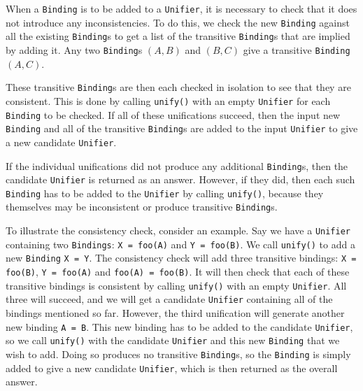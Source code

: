 \documentclass[12pt]{article}
\begin{document}
When a \verb|Binding| is to be added to a \verb|Unifier|, it is necessary to check that it does not introduce any inconsistencies. 
To do this, we check the new \verb|Binding| against all the existing \verb|Binding|s to get a list of the transitive \verb|Binding|s that are implied by adding it. 
Any two \verb|Binding|s $(A,B)$ and $(B,C)$ give a transitive \verb|Binding| $(A,C)$.

These transitive \verb|Binding|s are then each checked in isolation to see that they are consistent. 
This is done by calling \verb|unify()| with an empty \verb|Unifier| for each \verb|Binding| to be checked. 
If all of these unifications succeed, then the input new \verb|Binding| and all of the transitive \verb|Binding|s are added to the input \verb|Unifier| to give a new candidate \verb|Unifier|.

If the individual unifications did not produce any additional \verb|Binding|s, then the candidate \verb|Unifier| is returned as an answer. 
However, if they did, then each such \verb|Binding| has to be added to the \verb|Unifier| by calling \verb|unify()|, because they themselves may be inconsistent or produce transitive \verb|Binding|s.

To illustrate the consistency check, consider an example. 
Say we have a \verb|Unifier| containing two \verb|Bindings|: \verb|X = foo(A)| and \verb|Y = foo(B)|. 
We call \verb|unify()| to add a new \verb|Binding| \verb|X = Y|. 
The consistency check will add three transitive bindings: \verb|X = foo(B)|, \verb|Y = foo(A)| and \verb|foo(A) = foo(B)|. 
It will then check that each of these transitive bindings is consistent by calling \verb|unify()| with an empty \verb|Unifier|. 
All three will succeed, and we will get a candidate \verb|Unifier| containing all of the bindings mentioned so far.
However, the third unification will generate another new binding \verb|A = B|. 
This new binding has to be added to the candidate \verb|Unifier|, so we call \verb|unify()| with the candidate \verb|Unifier| and this new \verb|Binding| that we wish to add.
Doing so produces no transitive \verb|Binding|s, so the \verb|Binding| is simply added to give a new candidate \verb|Unifier|, which is then returned as the overall answer.

\end{document}
